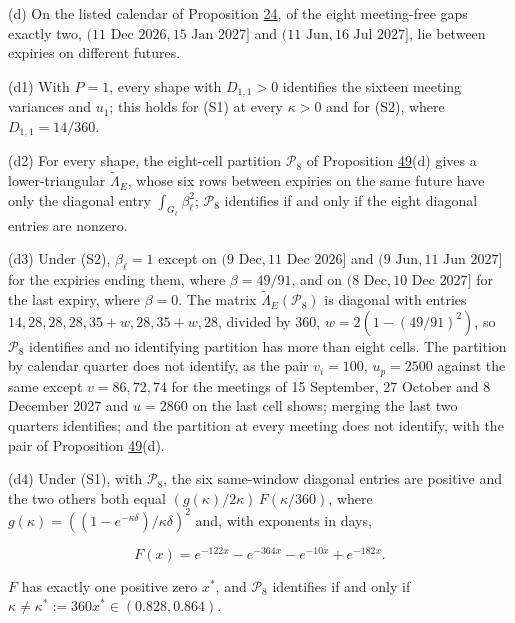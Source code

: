 \documentclass[11pt]{article}
\begin{document}
(d) On the listed calendar of Proposition \hyperref[res:Proposition-24]{24}, of the eight meeting-free gaps exactly two, \((11\text{ Dec }2026,15\text{ Jan }2027]\) and \((11\text{ Jun},16\text{ Jul }2027]\), lie between expiries on different futures.

(d1) With \(P=1\), every shape with \(D_{1,1}>0\) identifies the sixteen meeting variances and \(u_1\); this holds for (S1) at every \(\kappa>0\) and for (S2), where \(D_{1,1}=14/360\).

(d2) For every shape, the eight-cell partition \(\mathcal P_8\) of Proposition \hyperref[res:Proposition-49]{49}(d) gives a lower-triangular \(\tilde\Lambda_E\), whose six rows between expiries on the same future have only the diagonal entry \(\int_{G_\ell}\beta_\ell^2\); \(\mathcal P_8\) identifies if and only if the eight diagonal entries are nonzero.

(d3) Under (S2), \(\beta_\ell=1\) except on \((9\text{ Dec},11\text{ Dec }2026]\) and \((9\text{ Jun},11\text{ Jun }2027]\) for the expiries ending them, where \(\beta=49/91\), and on \((8\text{ Dec},10\text{ Dec }2027]\) for the last expiry, where \(\beta=0\). The matrix \(\tilde\Lambda_E(\mathcal P_8)\) is diagonal with entries \(14,28,28,28,35+w,28,35+w,28\), divided by 360, \(w=2(1-(49/91)^2)\), so \(\mathcal P_8\) identifies and no identifying partition has more than eight cells. The partition by calendar quarter does not identify, as the pair \(v_i=100\), \(u_p=2500\) against the same except \(v=86,72,74\) for the meetings of 15 September, 27 October and 8 December 2027 and \(u=2860\) on the last cell shows; merging the last two quarters identifies; and the partition at every meeting does not identify, with the pair of Proposition \hyperref[res:Proposition-49]{49}(d).

(d4) Under (S1), with \(\mathcal P_8\), the six same-window diagonal entries are positive and the two others both equal \((g(\kappa)/2\kappa)\,F(\kappa/360)\), where \(g(\kappa)=((1-e^{-\kappa\delta})/\kappa\delta)^2\) and, with exponents in days,

\begin{equation*}
F(x)=e^{-122x}-e^{-364x}-e^{-10x}+e^{-182x}. \tag{3.197}\label{eq:3.197}
\end{equation*}

\(F\) has exactly one positive zero \(x^*\), and \(\mathcal P_8\) identifies if and only if \(\kappa\neq\kappa^*:=360x^*\in(0.828,0.864)\).
\end{document}
